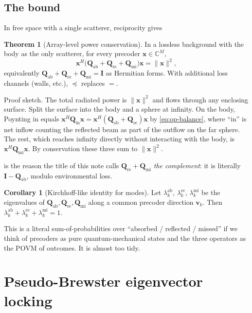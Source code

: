 \documentclass[11pt,a4paper]{article}
\theoremstyle{definition}
\newtheorem{theorem}{Theorem}[section]
\newtheorem{corollary}[corollary]{Corollary}
\newcommand{\Complex}{\mathbb{C}}
\newcommand{\Qabs}{\mathbf{Q}_{\mathrm{ab}}}
\newcommand{\Qref}{\mathbf{Q}_{\mathrm{re}}}
\newcommand{\Qinn}{\mathbf{Q}_{\mathrm{in}}}
\newcommand{\Qmis}{\mathbf{Q}_{\mathrm{mi}}}
\begin{document}
\subsection{The bound}

In free space with a single scatterer, reciprocity gives

\begin{theorem}[Array-level power conservation]\label{thm:global}
In a lossless background with the body as the only scatterer, for
every precoder $\mathbf{x}\in\Complex^M$,
\begin{equation}\label{eq:global-balance}
  \mathbf{x}^H\bigl(\Qabs+\Qref+\Qmis\bigr)\mathbf{x}
  =\|\mathbf{x}\|^2,
\end{equation}
equivalently $\Qabs+\Qref+\Qmis=\mathbf{I}$ as Hermitian forms.
With additional loss channels (walls, etc.), $\preceq$ replaces $=$.
\end{theorem}

Proof sketch.  The total radiated power is $\|\mathbf{x}\|^2$ and
flows through any enclosing surface.  Split the surface into the
body and a sphere at infinity.  On the body, Poynting in equals
$\mathbf{x}^H\Qinn\mathbf{x}=\mathbf{x}^H(\Qabs+\Qref)\mathbf{x}$ by
\cref{eq:op-balance}, where ``in'' is net inflow counting the
reflected beam as part of the outflow on the far sphere.  The rest,
which reaches infinity directly without interacting with the body,
is $\mathbf{x}^H\Qmis\mathbf{x}$.  By conservation these three sum
to $\|\mathbf{x}\|^2$.

 is the reason the title of this note calls
$\Qref+\Qmis$ \emph{the complement}: it is literally
$\mathbf{I}-\Qabs$, modulo environmental loss.

\begin{corollary}[Kirchhoff-like identity for modes]\label{cor:modes}
Let $\lambda_k^{\mathrm{ab}}$, $\lambda_k^{\mathrm{re}}$,
$\lambda_k^{\mathrm{mi}}$ be the eigenvalues of $\Qabs,\Qref,\Qmis$
along a common precoder direction $\mathbf{v}_k$.  Then
$\lambda_k^{\mathrm{ab}}+\lambda_k^{\mathrm{re}}
+\lambda_k^{\mathrm{mi}}=1$.
\end{corollary}

This is a literal sum-of-probabilities over ``absorbed / reflected /
missed'' if we think of precoders as pure quantum-mechanical states
and the three operators as the POVM of outcomes.  It is almost too
tidy.

\section{Pseudo-Brewster eigenvector locking}
\end{document}
